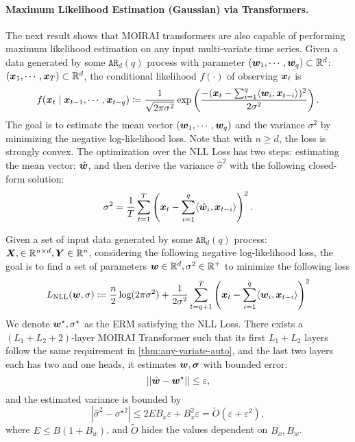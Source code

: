 \paragraph{Maximum Likelihood Estimation (Gaussian) via Transformers.}
The next result shows that MOIRAI transformers are also capable of performing maximum likelihood estimation on any input multi-variate time series.
Given a data generated by some $\mathtt{AR}_d(q)$ process with parameter $(\bm{w}_1, \cdots, \bm{w}_q) \subset \mathbb{R}^{d}$: 
$(\bm{x}_1, \cdots, \bm{x}_T) \subset \mathbb{R}^d$, the conditional likelihood $f(\cdot)$ of observing $\bm{x}_t$ is
\[
f(\bm{x}_t \mid \bm{x}_{t-1}, \cdots, \bm{x}_{t-q} )
\coloneq
\frac{1}{\sqrt{2\pi \sigma^2}}
\exp
\left(
\frac{-( \bm{x}_t - \sum_{i=1}^q \langle \bm{w}_i,  \bm{x}_{t-i} \rangle )^2 }{2 \sigma^2}
\right).
\]
The goal is to estimate the mean vector $(\bm{w}_1, \cdots, \bm{w}_q)$ and the variance $\sigma^2$ by minimizing the negative log-likelihood loss.
Note that with $n \geq d$, the loss is strongly convex.
The optimization over the NLL Loss has two steps: estimating the mean vector: $\hat{\bm{w}}$, and then derive the variance $\hat{\sigma}^2$ with the following closed-form solution:
\[
\sigma^2
=
\frac{1}{T}
\sum_{t=1}^T
\left(
\bm{x}_t - \sum_{i=1}^q
\langle \hat{\bm{w}}_i, \bm{x}_{t-i} \rangle
\right)^2.
\]

\begin{theorem}\label{thm:moirai-mle}
    Given a set of input data generated by some $\mathtt{AR}_d(q)$ process: $\bm{X}, \in \mathbb{R}^{n \times d}, \bm{Y} \in \mathbb{R}^n$, considering the following negative log-likelihood loss, the goal is to find a set of parameters $\bm{w} \in \mathbb{R}^d, \sigma^2 \in \mathbb{R}^+$ to minimize the following loss
    \[
    L_{\text{NLL}}
    ( \bm{w}, \sigma )
    \coloneq
    \frac{n}{2}
    \log (2 \pi \sigma^2) +
    \frac{1}{2\sigma^2}
    \sum_{t=q+1}^T
    \left(
    \bm{x}_t - \sum_{i=1}^q
    \langle \bm{w}_i, \bm{x}_{t-i} \rangle
    \right)^2
    \]
    We denote $\bm{w}^\star, \sigma^\star$ as the ERM satisfying the NLL Loss.
    There exists a $(L_1 + L_2 + 2)$-layer MOIRAI Transformer such that its first $L_1+L_2$ layers follow the same requirement in \cref{thm:any-variate-auto}, and the last two layers each has two and one heads, it estimates $\bm{w}, \bm{\sigma}$ with bounded error:
    \[
    \left\lvert \left\lvert \hat{\bm{w}} - \bm{w}^\star \right\rvert \right\rvert \leq
    \varepsilon,
    \]
    and the estimated variance is bounded by
    \[
    \left\vert \hat{\sigma}^2 - {\sigma^\star}^2 \right\vert
    \leq
    2 E B_x \varepsilon + B_x^2 \varepsilon
    =
    \tilde{O}(\varepsilon + \varepsilon^2),
    \]
    where $E \leq B(1+B_w)$, and $\tilde{O}$ hides the values dependent on $B_x, B_w$.
\end{theorem}


